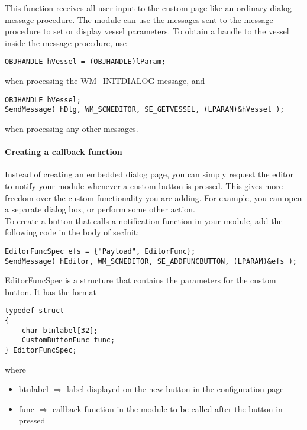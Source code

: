 \documentclass[Orbiter Developer Manual.tex]{subfiles}
\begin{document}
\noindent
This function receives all user input to the custom page like an ordinary dialog message procedure. The module can use the messages sent to the message procedure to set or display vessel parameters. To obtain a handle to the vessel inside the message procedure, use

\begin{lstlisting}
OBJHANDLE hVessel = (OBJHANDLE)lParam;
\end{lstlisting}

\noindent
when processing the WM\_INITDIALOG message, and

\begin{lstlisting}
OBJHANDLE hVessel;
SendMessage( hDlg, WM_SCNEDITOR, SE_GETVESSEL, (LPARAM)&hVessel );
\end{lstlisting}

\noindent
when processing any other messages.

\paragraph{Creating a callback function}
Instead of creating an embedded dialog page, you can simply request the editor to notify your module whenever a custom button is pressed. This gives more freedom over the custom functionality you are adding. For example, you can open a separate dialog box, or perform some other action.\\
To create a button that calls a notification function in your module, add the following code in the body of secInit:

\begin{lstlisting}
EditorFuncSpec efs = {"Payload", EditorFunc};
SendMessage( hEditor, WM_SCNEDITOR, SE_ADDFUNCBUTTON, (LPARAM)&efs );
\end{lstlisting}

\noindent
EditorFuncSpec is a structure that contains the parameters for the custom button. It has the format

\begin{lstlisting}
typedef struct
{
	char btnlabel[32];
	CustomButtonFunc func;
} EditorFuncSpec;
\end{lstlisting}

\noindent
where

\begin{itemize}
\item btnlabel $\Rightarrow$ label displayed on the new button in the configuration page
\item func $\Rightarrow$ callback function in the module to be called after the button in pressed
\end{itemize}
\end{document}
